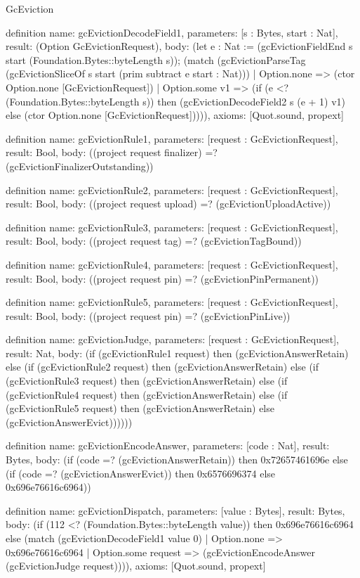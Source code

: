 \begin{lexlean}{GcEviction}
\begin{semanticmodule}
definition{
  name: gcEvictionDecodeField1,
  parameters: [s : Bytes, start : Nat],
  result: (Option GcEvictionRequest),
  body: (let e : Nat := (gcEvictionFieldEnd s start (Foundation.Bytes::byteLength s)); (match (gcEvictionParseTag (gcEvictionSliceOf s start (prim subtract e start : Nat)))
    | Option.none => (ctor Option.none [GcEvictionRequest])
    | Option.some v1 => (if (e <? (Foundation.Bytes::byteLength s)) then (gcEvictionDecodeField2 s (e + 1) v1) else (ctor Option.none [GcEvictionRequest])))),
  axioms: [Quot.sound, propext]
}

definition{
  name: gcEvictionRule1,
  parameters: [request : GcEvictionRequest],
  result: Bool,
  body: ((project request finalizer) =? (gcEvictionFinalizerOutstanding))
}

definition{
  name: gcEvictionRule2,
  parameters: [request : GcEvictionRequest],
  result: Bool,
  body: ((project request upload) =? (gcEvictionUploadActive))
}

definition{
  name: gcEvictionRule3,
  parameters: [request : GcEvictionRequest],
  result: Bool,
  body: ((project request tag) =? (gcEvictionTagBound))
}

definition{
  name: gcEvictionRule4,
  parameters: [request : GcEvictionRequest],
  result: Bool,
  body: ((project request pin) =? (gcEvictionPinPermanent))
}

definition{
  name: gcEvictionRule5,
  parameters: [request : GcEvictionRequest],
  result: Bool,
  body: ((project request pin) =? (gcEvictionPinLive))
}

definition{
  name: gcEvictionJudge,
  parameters: [request : GcEvictionRequest],
  result: Nat,
  body: (if (gcEvictionRule1 request) then (gcEvictionAnswerRetain) else (if (gcEvictionRule2 request) then (gcEvictionAnswerRetain) else (if (gcEvictionRule3 request) then (gcEvictionAnswerRetain) else (if (gcEvictionRule4 request) then (gcEvictionAnswerRetain) else (if (gcEvictionRule5 request) then (gcEvictionAnswerRetain) else (gcEvictionAnswerEvict))))))
}

definition{
  name: gcEvictionEncodeAnswer,
  parameters: [code : Nat],
  result: Bytes,
  body: (if (code =? (gcEvictionAnswerRetain)) then 0x72657461696e else (if (code =? (gcEvictionAnswerEvict)) then 0x6576696374 else 0x696e76616c6964))
}

definition{
  name: gcEvictionDispatch,
  parameters: [value : Bytes],
  result: Bytes,
  body: (if (112 <? (Foundation.Bytes::byteLength value)) then 0x696e76616c6964 else (match (gcEvictionDecodeField1 value 0)
    | Option.none => 0x696e76616c6964
    | Option.some request => (gcEvictionEncodeAnswer (gcEvictionJudge request)))),
  axioms: [Quot.sound, propext]
}
\end{semanticmodule}
\end{lexlean}
